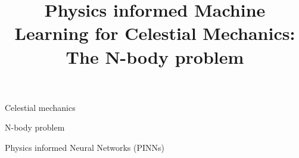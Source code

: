 \documentclass[draft]{agujournal2019}
\begin{document}
\title{Physics informed Machine Learning for Celestial Mechanics: The N-body problem}

%
%












\begin{keypoints}
\item Celestial mechanics
\item N-body problem
\item Physics informed Neural Networks (PINNs)
\end{keypoints}
\end{document}
